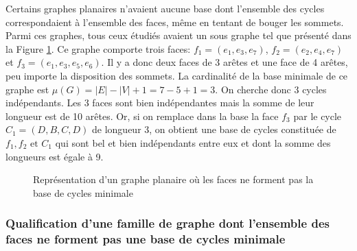 \documentclass{article}
\begin{document}
Certains graphes planaires n'avaient aucune base dont l'ensemble des cycles correspondaient à l'ensemble des faces, même en tentant de bouger les sommets. Parmi ces graphes, tous ceux étudiés avaient un sous graphe tel que présenté dans la Figure \ref{homéomorphe-multigraphe}. Ce graphe comporte trois faces: $f_1=(e_1, e_3, e_7)$, $f_2=(e_2, e_4, e_7)$ et $f_3=(e_1,e_3,e_5,e_6)$. Il y a donc deux faces de 3 arêtes et une face de 4 arêtes, peu importe la disposition des sommets. La cardinalité de la base minimale de ce graphe est $\mu(G) = \lvert E \rvert -\lvert V \rvert +1 = 7 - 5 + 1 =3$. On cherche donc 3 cycles indépendants. Les 3 faces sont bien indépendantes mais la somme de leur longueur est de 10 arêtes. Or, si on remplace dans la base la face $f_3$ par le cycle $C_1=(D,B,C,D)$ de longueur 3, on obtient une base de cycles constituée de $f_1,f_2\text{ et } C_1$ qui sont bel et bien indépendants entre eux et dont la somme des longueurs est égale à 9.

\begin{figure}[h]
    \centering

    \caption{Représentation d'un graphe planaire où les faces ne forment pas la base de cycles minimale}
    \label{homéomorphe-multigraphe}
\end{figure}

\subsubsection{Qualification d'une famille de graphe dont l'ensemble des faces ne forment pas une base de cycles minimale}
\end{document}
